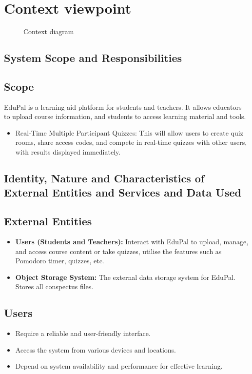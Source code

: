 \section{Context viewpoint}

\begin{figure}[H]
    \centering
    \caption{Context diagram}
    \label{context-view-context-diagram}
\end{figure}


\subsection{System Scope and Responsibilities}

\subsection*{Scope}
EduPal is a learning aid platform for students and teachers. It allows educators to upload course information, and students to access learning material and tools.

\begin{itemize}
    \item Real-Time Multiple Participant Quizzes: This will allow users to create quiz rooms, share access codes, and compete in real-time quizzes with other users, with results displayed immediately.
\end{itemize}


\subsection{Identity, Nature and Characteristics of External Entities and Services and Data Used}

\subsection*{External Entities}
\begin{itemize}
    \item \textbf{Users (Students and Teachers):} Interact with EduPal to upload, manage, and access course content or take quizzes, utilise the features such as Pomodoro timer, quizzes, etc.
    \item \textbf{Object Storage System:} The external data storage system for EduPal. Stores all conspectus files.
\end{itemize}

\subsection*{Users}
\begin{itemize}
    \item Require a reliable and user-friendly interface.
    \item Access the system from various devices and locations.
    \item Depend on system availability and performance for effective learning.
\end{itemize}

